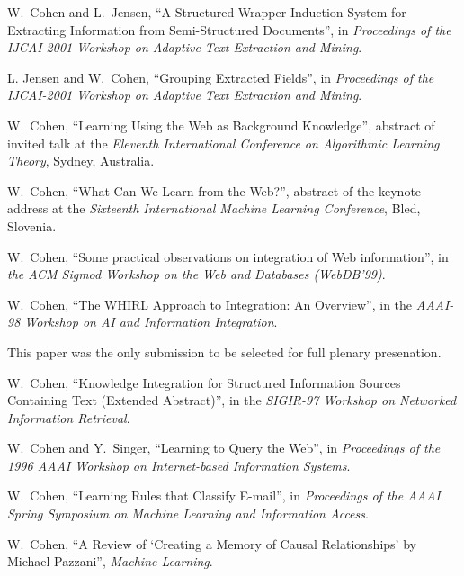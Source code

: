 \item[2001] W.~Cohen and L.~Jensen, ``A Structured Wrapper Induction 
System for Extracting Information from Semi-Structured Documents'', in
{\em Proceedings of the IJCAI-2001 Workshop on Adaptive Text
Extraction and Mining}.

\item[2001] L. Jensen and W.~Cohen, ``Grouping Extracted Fields'',
in {\em Proceedings of the IJCAI-2001 Workshop on Adaptive Text
Extraction and Mining}.

\item[2000] W.~Cohen, ``Learning Using the Web as Background Knowledge'',
	abstract of invited talk at the {\em Eleventh International
	Conference on Algorithmic Learning Theory}, Sydney, Australia.

\item[1999] W.~Cohen, ``What Can We Learn from the Web?'', abstract of
	the keynote address at the {\em Sixteenth International Machine Learning
	Conference}, Bled, Slovenia.

\item[1999] W.~Cohen, ``Some practical observations on integration of
	Web information'', in {\em the ACM Sigmod Workshop on the Web 
	and Databases (WebDB'99)}. 

\item[1998] W.~Cohen, ``The WHIRL Approach to Integration: An Overview'',
		in the {\em AAAI-98 Workshop on AI and Information 
		Integration}.  

		This paper was the only submission to be
		selected for full plenary presenation.

\item[1997] W.~Cohen, ``Knowledge Integration for Structured
		Information Sources Containing Text (Extended
		Abstract)'', in the {\em SIGIR-97 Workshop on
		Networked Information Retrieval}.

\item[1996] W.~Cohen and Y.~Singer, ``Learning to Query the Web'',
	    	in {\em Proceedings of the 1996 AAAI Workshop
		on Internet-based Information Systems}.

\item[1996] W.~Cohen, ``Learning Rules that Classify E-mail'',
	    	in {\em Proceedings of the AAAI Spring Symposium on 
		Machine Learning and Information Access}.

\item[1993] 	W.~Cohen, ``A Review of `Creating a Memory of
		Causal Relationships' by Michael Pazzani'', 
		{\em Machine Learning}.

